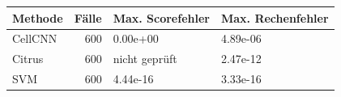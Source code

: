 \begin{tabular}{lrll}
\toprule
Methode & Fälle & Max. Scorefehler & Max. Rechenfehler \\
\midrule
CellCNN & 600 & 0.00e+00 & 4.89e-06 \\
Citrus & 600 & nicht geprüft & 2.47e-12 \\
SVM & 600 & 4.44e-16 & 3.33e-16 \\
\bottomrule
\end{tabular}
